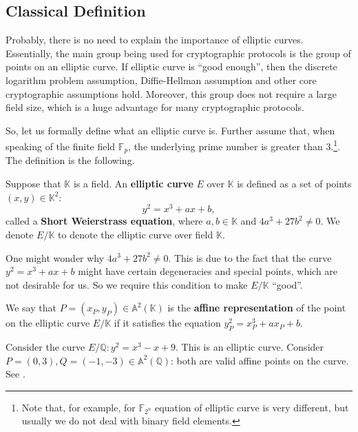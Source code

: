 \documentclass[../lecture-notes-148x210.tex]{subfiles}
\begin{document}
\subsection{Classical Definition}

Probably, there is no need to explain the importance of elliptic curves.
Essentially, the main group being used for cryptographic protocols is the group
of points on an elliptic curve. If elliptic curve is ``good enough'', then the
discrete logarithm problem assumption, Diffie-Hellman assumption and other core
cryptographic assumptions hold. Moreover, this group does not require a large
field size, which is a huge advantage for many cryptographic protocols.

So, let us formally define what an elliptic curve is. Further assume that, when speaking of the finite field $\mathbb{F}_p$, the underlying prime number is greater than $3$.\footnote{Note that, for example, for $\mathbb{F}_{2^n}$ equation of elliptic curve is very different, but usually we do not deal with binary field elements.}. The definition is the following.

\begin{definition}
    Suppose that $\mathbb{K}$ is a field. An \textbf{elliptic curve} $E$ over $\mathbb{K}$ is defined as a set of points $(x,y) \in \mathbb{K}^2$:
    \begin{equation*}
        y^2 = x^3+ax+b,
    \end{equation*}
    called a \textbf{Short Weierstrass equation}, where $a,b \in \mathbb{K}$ and $4a^3+27b^2 \neq 0$. We denote $E/\mathbb{K}$ to denote the elliptic curve over field $\mathbb{K}$.
\end{definition}

\begin{remark}
    One might wonder why $4a^3+27b^2 \neq 0$. This is due to the fact that the curve $y^2=x^3+ax+b$ might have certain degeneracies and special points, which are not desirable for us. So we require this condition to make $E/\mathbb{K}$ ``good''.
\end{remark}

\begin{definition}
    We say that $P=(x_P,y_P) \in \mathbb{A}^2(\mathbb{K})$ is the \textbf{affine representation} of the point on the elliptic curve $E/\mathbb{K}$ if it satisfies the equation $y_P^2=x_P^3+ax_P+b$.
\end{definition}

\begin{example}
    Consider the curve $E/\mathbb{Q}: y^2=x^3-x+9$. This is an elliptic curve. Consider $P=(0,3), Q=(-1,-3) \in \mathbb{A}^2(\mathbb{Q})$: both are valid affine points on the curve. See .
\end{example}
\end{document}

